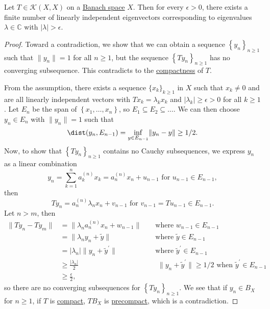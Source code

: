 \begin{theorem}\label{thm:point-spectrum-of-compact-op}
	Let \(T\in \mathcal{K} (X, X)\) on a \hyperref[def:Banach-space]{Banach space} \(X\). Then for every \(\epsilon > 0\), there exists a finite number of linearly independent eigenvectors corresponding to eigenvalues \(\lambda \in \mathbb{C} \) with \(\vert \lambda  \vert > \epsilon \).
\end{theorem}
\begin{proof}
	Toward a contradiction, we show that we can obtain a sequence \(\left\{ y_n \right\} _{n\geq 1}\) such that \(\lVert y_n \rVert = 1\) for all \(n\geq 1\), but the sequence \(\left\{ Ty_n \right\} _{n\geq 1}\) has no converging subsequence. This contradicts to the \hyperref[def:compact-op]{compactness} of \(T\).

	From the assumption, there exists a sequence \(\{x_k\}_{k\geq 1}\) in \(X\) such that \(x_k \neq 0\) and are all linearly independent vectors with \(Tx_k = \lambda _k x_k\) and \(\vert \lambda _k \vert \geq \epsilon > 0\) for all \(k\geq 1\). Let \(E_n\) be the span of \(\left\{ x_1, \dots , x_n \right\}\), so \(E_1 \subseteq E_2 \subseteq \dots \). We can then choose \(y_n \in E_n\) with \(\lVert y_n \rVert = 1\) such that
	\[
		\dist(y_n, E_{n-1}) = \inf _{y\in E_{n-1}} \lVert y_n - y \rVert \geq 1 / 2.
	\]
	Now, to show that \(\left\{ Ty_n \right\} _{n\geq 1}\) contains no Cauchy subsequences, we express \(y_n\) as a linear combination
	\[
		y_n = \sum_{k=1}^{n} a_k^{(n)} x_k = a_n ^{(n)} x_n + u_{n-1} \text{ for \(u_{n-1} \in E_{n-1}\)} ,
	\]
	then
	\[
		Ty_n = a_n^{(n)} \lambda _n x_n + v_{n-1} \text{ for \(v_{n-1} = Tu_{n-1}\in E_{n-1}\)}.
	\]
	Let \(n > m\), then
	\[
		\begin{aligned}
			\lVert Ty_n - Ty_m \rVert
			 & = \lVert \lambda _n a_n ^{(n)} x_n + w_{n-1}\rVert                 &  & \text{ where \(w_{n-1} \in E_{n-1}\)}                                                                       \\
			 & = \lVert \lambda _n y_n + \widetilde{y}  \rVert                    &  & \text{ where \(\widetilde{y} \in E_{n-1}\)}                                                                 \\
			 & = \vert \lambda _n \vert \lVert y_n + \widetilde{y} ^\prime \rVert &  & \text{ where \(\widetilde{y} ^\prime \in E_{n-1}\)}                                                         \\
			 & \geq \frac{\vert \lambda _n \vert }{2}                             &  & \text{ \(\lVert y_n + \widetilde{y} ^\prime  \rVert \geq 1 / 2\) when \(\widetilde{y}^\prime \in E_{n-1}\)} \\
			 & \geq \frac{\epsilon}{2},
		\end{aligned}
	\]
	so there are no converging subsequences for \(\left\{ Ty_n \right\} _{n\geq 1}\). We see that if \(y_n\in B_X\) for \(n\geq 1\), if \(T\) is \hyperref[def:compact-op]{compact}, \(TB_X\) is \hyperref[def:precompact]{precompact}, which is a contradiction.
\end{proof}

